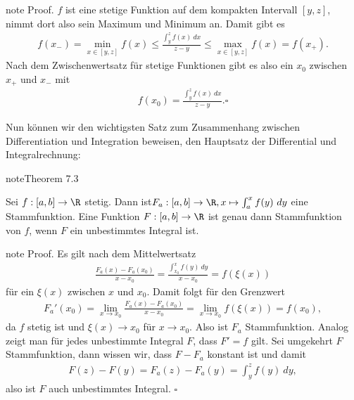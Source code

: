 \documentclass[letterpaper,10pt,english]{jupyterBook}
\begin{document}
\begin{sphinxadmonition}{note}
Proof. \(f\) ist eine stetige Funktion auf dem kompakten Intervall \([y,z]\), nimmt dort also sein Maximum und Minimum an. Damit gibt es
\begin{equation*}
\begin{split} f(x_-) = \min_{x \in [y,z]} f(x) \leq \frac{\int_y^z f(x)~dx}{z-y} \leq  \max_{x \in [y,z]} f(x) = f(x_+).\end{split}
\end{equation*}
Nach dem Zwischenwertsatz für stetige Funktionen gibt es also ein \(x_0\) zwischen \(x_+\) und \(x_-\) mit
\begin{equation*}
\begin{split} f(x_0) = \frac{\int_y^z f(x)~dx}{z-y}. \square\end{split}
\end{equation*}\end{sphinxadmonition}

Nun können wir den wichtigsten Satz zum Zusammenhang zwischen Differentiation und Integration beweisen, den Hauptsatz der Differential\sphinxhyphen{} und Integralrechnung:
\label{integration/hdi:theorem-3}
\begin{sphinxadmonition}{note}{Theorem 7.3}



Sei \(f:[a,b] \rightarrow \R\) stetig. Dann ist\(F_a: [a,b] \rightarrow \R, x \mapsto \int_a^x f(y)~dy\)
eine Stammfunktion. Eine Funktion \(F:[a,b] \rightarrow \R\) ist genau dann Stammfunktion von \(f\), wenn \(F\) ein unbestimmtes Integral ist.
\end{sphinxadmonition}

\begin{sphinxadmonition}{note}
Proof. Es gilt nach dem Mittelwertsatz
\begin{equation*}
\begin{split} \frac{F_a(x)-F_a(x_0)}{x-x_0} = \frac{\int_{x_0}^x f(y)~dy }{x-x_0} = f(\xi(x))\end{split}
\end{equation*}
für ein \(\xi(x)\) zwischen \(x\) und \(x_0\). Damit folgt für den Grenzwert
\begin{equation*}
\begin{split} F_a'(x_0) = \lim_{x\rightarrow x_0}\frac{F_a(x)-F_a(x_0)}{x-x_0} =  \lim_{x\rightarrow x_0}f(\xi(x)) = f(x_0),\end{split}
\end{equation*}
da \(f\) stetig ist und \(\xi(x) \rightarrow x_0\) für \(x \rightarrow x_0\). Also ist \(F_a\) Stammfunktion.
Analog zeigt man für jedes unbestimmte Integral \(F\), dass \(F'=f\) gilt.
Sei umgekehrt \(F\) Stammfunktion, dann wissen wir, dass \(F-F_a\) konstant ist und damit
\begin{equation*}
\begin{split} F(z) - F(y) = F_a(z) - F_a(y) = \int_y^z f(y)~dy,\end{split}
\end{equation*}
also ist \(F\) auch unbestimmtes Integral. \(\square\)
\end{sphinxadmonition}
\end{document}
